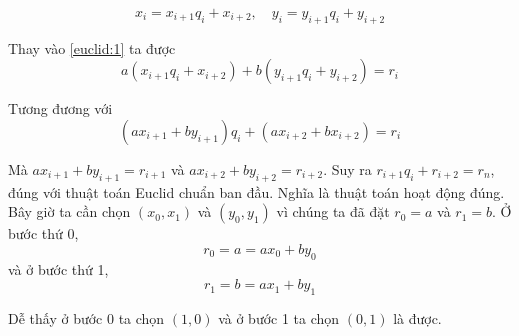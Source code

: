 \begin{equation}
    x_i = x_{i+1} q_i + x_{i+2}, \quad y_i = y_{i+1} q_i + y_{i+2}
\end{equation}

Thay vào \ref{euclid:1} ta được
\begin{equation}
    a (x_{i+1} q_i + x_{i+2}) + b (y_{i+1} q_i + y_{i+2}) = r_i
\end{equation}

Tương đương với
\[(a x_{i+1} + b y_{i+1}) q_i + (a x_{i+2} + b x_{i+2}) = r_i\]

Mà $a x_{i+1} + b y_{i+1} = r_{i+1}$ và $a x_{i+2} + b y_{i+2}
= r_{i+2}$. Suy ra $r_{i+1} q_i + r_{i+2} = r_n$, đúng với thuật toán
Euclid chuẩn ban đầu. Nghĩa là thuật toán hoạt động đúng.
Bây giờ ta cần chọn $(x_0, x_1)$ và $(y_0, y_1)$ vì chúng ta
đã đặt $r_0 = a$ và $r_1 = b$. Ở bước thứ 0,
\[r_0 = a = a x_0 + b y_0\]
và ở bước thứ 1,
\[r_1 = b = a x_1 + b y_1\]

Dễ thấy ở bước 0 ta chọn $(1, 0)$ và ở bước 1 ta chọn $(0, 1)$ là được.
